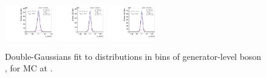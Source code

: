 \begin{figure}[htb]
\includegraphics[width=0.19\textwidth]{plots/Appendix_Recoil_Fits/WmmMC_PF_13TeV_2G/pfu2fit_32.pdf}
\includegraphics[width=0.19\textwidth]{plots/Appendix_Recoil_Fits/WmmMC_PF_13TeV_2G/pfu2fit_33.pdf}
\includegraphics[width=0.19\textwidth]{plots/Appendix_Recoil_Fits/WmmMC_PF_13TeV_2G/pfu2fit_34.pdf}
\caption{Double-Gaussians fit to \uprp distributions in bins of generator-level boson \pt, for \wm MC at \serah.}
\label{fig:a:recoil:fit:wm:u2:13}
\end{figure}